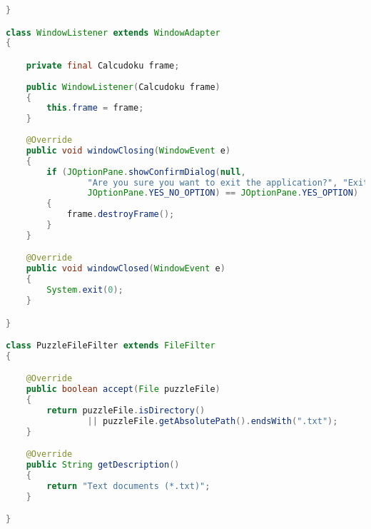 \begin{lstlisting}[language=Java,basicstyle=\tiny,caption=Calcudoku.java]
}

class WindowListener extends WindowAdapter
{

    private final Calcudoku frame;
    
    public WindowListener(Calcudoku frame)
    {
        this.frame = frame;
    }
    
    @Override
    public void windowClosing(WindowEvent e)
    {
        if (JOptionPane.showConfirmDialog(null,
                "Are you sure you want to exit the application?", "Exit", 
                JOptionPane.YES_NO_OPTION) == JOptionPane.YES_OPTION)
        {
            frame.destroyFrame();
        }
    }

    @Override
    public void windowClosed(WindowEvent e)
    {
        System.exit(0);
    }

}

class PuzzleFileFilter extends FileFilter
{

    @Override
    public boolean accept(File puzzleFile)
    {
        return puzzleFile.isDirectory() 
                || puzzleFile.getAbsolutePath().endsWith(".txt");
    }

    @Override
    public String getDescription()
    {
        return "Text documents (*.txt)";
    }

}
\end{lstlisting}

